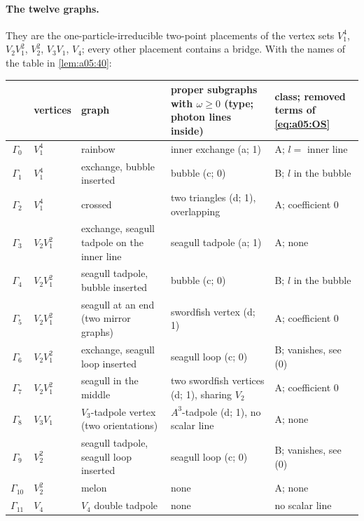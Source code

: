 \paragraph{The twelve graphs.} They are the one-particle-irreducible two-point placements of the vertex sets $V_1^4$, $V_2V_1^2$, $V_2^2$, $V_3V_1$, $V_4$; every other placement contains a bridge. With the names of the table in \cref{lem:a05:40}:
\begin{center}\small
\begin{tabular}{@{}cllll@{}}
& vertices & graph & proper subgraphs with $\omega\ge0$ (type; photon lines inside) & class; removed terms of \eqref{eq:a05:OS}\\\hline
$\Gamma_0$ & $V_1^4$ & rainbow & inner exchange (a; 1) & A; $l=$ inner line\\
$\Gamma_1$ & $V_1^4$ & exchange, bubble inserted & bubble (c; 0) & B; $l$ in the bubble\\
$\Gamma_2$ & $V_1^4$ & crossed & two triangles (d; 1), overlapping & A; coefficient $0$\\
$\Gamma_3$ & $V_2V_1^2$ & exchange, seagull tadpole on the inner line & seagull tadpole (a; 1) & A; none\\
$\Gamma_4$ & $V_2V_1^2$ & seagull tadpole, bubble inserted & bubble (c; 0) & B; $l$ in the bubble\\
$\Gamma_5$ & $V_2V_1^2$ & seagull at an end (two mirror graphs) & swordfish vertex (d; 1) & A; coefficient $0$\\
$\Gamma_6$ & $V_2V_1^2$ & exchange, seagull loop inserted & seagull loop (c; 0) & B; vanishes, see (0)\\
$\Gamma_7$ & $V_2V_1^2$ & seagull in the middle & two swordfish vertices (d; 1), sharing $V_2$ & A; coefficient $0$\\
$\Gamma_8$ & $V_3V_1$ & $V_3$-tadpole vertex (two orientations) & $A^3$-tadpole (d; 1), no scalar line & A; none\\
$\Gamma_9$ & $V_2^2$ & seagull tadpole, seagull loop inserted & seagull loop (c; 0) & B; vanishes, see (0)\\
$\Gamma_{10}$ & $V_2^2$ & melon & none & A; none\\
$\Gamma_{11}$ & $V_4$ & $V_4$ double tadpole & none & no scalar line
\end{tabular}
\end{center}
